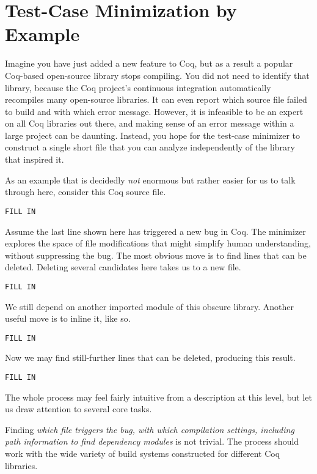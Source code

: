 \documentclass[a4paper,USenglish,cleveref,autoref,thm-restate]{lipics-v2021}
\begin{document}
\section{Test-Case Minimization by Example}\label{sec:example}

Imagine you have just added a new feature to Coq, but as a result a popular Coq-based open-source library stops compiling.
You did not need to identify that library, because the Coq project's continuous integration automatically recompiles many open-source libraries.
It can even report which source file failed to build and with which error message.
However, it is infeasible to be an expert on all Coq libraries out there, and making sense of an error message within a large project can be daunting.
Instead, you hope for the test-case minimizer to construct a single short file that you can analyze independently of the library that inspired it.

As an example that is decidedly \emph{not} enormous but rather easier for us to talk through here, consider this Coq source file.
\begin{verbatim}
FILL IN
\end{verbatim}

Assume the last line shown here has triggered a new bug in Coq.
The minimizer explores the space of file modifications that might simplify human understanding, without suppressing the bug.
The most obvious move is to find lines that can be deleted.
Deleting several candidates here takes us to a new file.
\begin{verbatim}
FILL IN
\end{verbatim}

We still depend on another imported module of this obscure library.
Another useful move is to inline it, like so.
\begin{verbatim}
FILL IN
\end{verbatim}

Now we may find still-further lines that can be deleted, producing this result.
\begin{verbatim}
FILL IN
\end{verbatim}

The whole process may feel fairly intuitive from a description at this level, but let us draw attention to several core tasks.

Finding \emph{which file triggers the bug, with which compilation settings, including path information to find dependency modules} is not trivial.
The process should work with the wide variety of build systems constructed for different Coq libraries.
\end{document}
